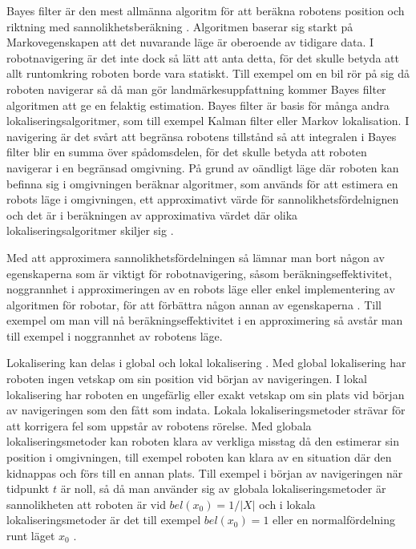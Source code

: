 Bayes filter är den mest allmänna algoritm för att beräkna robotens position och riktning med sannolikhetsberäkning \citep{ProbabilisticRobotics}. Algoritmen baserar sig starkt på Markovegenskapen att det nuvarande läge är oberoende av tidigare data. I robotnavigering är det inte dock så lätt att anta detta, för det skulle betyda att allt runtomkring roboten borde vara statiskt. Till exempel om en bil rör på sig då roboten navigerar så då man gör landmärkesuppfattning kommer Bayes filter algoritmen att ge en felaktig estimation. Bayes filter är basis för många andra lokaliseringsalgoritmer, som till exempel Kalman filter eller Markov lokalisation. I navigering är det svårt att begränsa robotens tillstånd så att integralen i Bayes filter blir en summa över spådomsdelen, för det skulle betyda att roboten navigerar i en begränsad omgivning. På grund av oändligt läge där roboten kan befinna sig i omgivningen beräknar algoritmer, som används för att estimera en robots läge i omgivningen, ett approximativt värde för sannolikhetsfördelnignen och det är i beräkningen av approximativa värdet där olika lokaliseringsalgoritmer skiljer sig \citep{ProbabilisticRobotics}.

Med att approximera sannolikhetsfördelningen så lämnar man bort någon av egenskaperna som är viktigt för robotnavigering, såsom beräkningseffektivitet, noggrannhet i approximeringen av en robots läge eller enkel implementering av algoritmen för robotar, för att förbättra någon annan av egenskaperna \citep{ProbabilisticRobotics}. Till exempel om man vill nå beräkningseffektivitet i en approximering så avstår man till exempel i noggrannhet av robotens läge.

Lokalisering kan delas i global och lokal lokalisering \citep{982903, globalsubmaps}. Med global lokalisering har roboten ingen vetskap om sin position vid början av navigeringen. I lokal lokalisering har roboten en ungefärlig eller exakt vetskap om sin plats vid början av navigeringen som den fått som indata. Lokala lokaliseringsmetoder strävar för att korrigera fel som uppstår av robotens rörelse. Med globala lokaliseringsmetoder kan roboten klara av verkliga misstag då den estimerar sin position i omgivningen, till exempel roboten kan klara av en situation där den kidnappas och förs till en annan plats. Till exempel i början av navigeringen när tidpunkt $t$ är noll, så då man använder sig av globala lokaliseringsmetoder är sannolikheten att roboten är vid $bel(x_0) = 1 / |X|$ och i lokala lokaliseringsmetoder är det till exempel $bel(x_0) = 1$ eller en normalfördelning runt läget $x_0$ \citep{ProbabilisticRobotics}.

